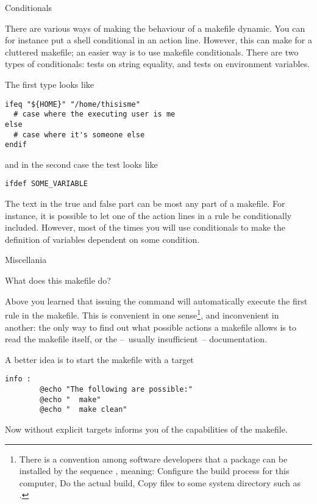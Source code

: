  {Conditionals}

There are various ways of making the behaviour of a makefile dynamic.
You can for instance put a shell conditional in an action line.
However, this can make for a cluttered makefile; an easier way is to use
makefile conditionals. There are two types of conditionals: tests on string
equality, and tests on environment variables.

The first type looks like
\begin{verbatim}
ifeq "${HOME}" "/home/thisisme"
  # case where the executing user is me
else
  # case where it's someone else
endif
\end{verbatim}
and in the second case the test looks like
\begin{verbatim}
ifdef SOME_VARIABLE
\end{verbatim}
The text in the true and false part can be most any part of a
makefile. For instance, it is possible to let one of the action lines
in a rule be conditionally included. However, most of the times you
will use conditionals to make the definition of variables dependent on
some condition.


 {Miscellania}

 {What does this makefile do?}

Above you learned that issuing the  command will automatically
execute the first rule in the makefile. This is convenient in one
sense\footnote {There is a convention among software developers that a
  package can be installed by the sequence , meaning: Configure the build process for this
  computer, Do the actual build, Copy files to some system directory
  such as .}, and inconvenient in another: the only way to
find out what possible actions a makefile allows is to read the
makefile itself, or the --~usually insufficient~-- documentation.

A better idea is to start the makefile with a target
\begin{verbatim}
info :
        @echo "The following are possible:"
        @echo "  make"
        @echo "  make clean"
\end{verbatim}
Now  without explicit targets informs you of the capabilities
of the makefile.

